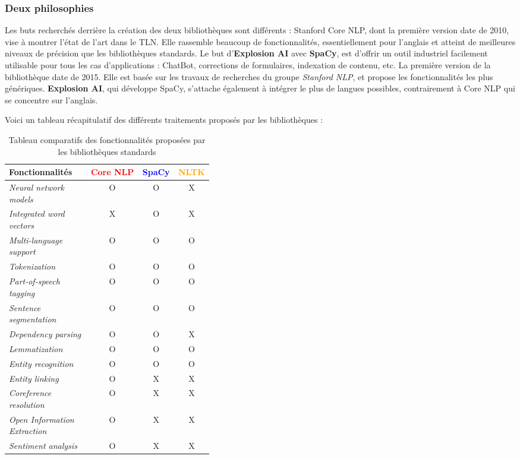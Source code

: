 \subsubsection{Deux philosophies}
Les buts recherchés derrière la création des deux bibliothèques sont différents : Stanford Core NLP, dont la première version date de 2010, vise à montrer l'état de l'art dans le TLN. Elle rassemble beaucoup de fonctionnalités, essentiellement pour l'anglais et atteint de meilleures niveaux de précision que les bibliothèques standards. Le but d'\textbf{Explosion AI} avec \textbf{SpaCy}, est d'offrir un outil industriel facilement utilisable pour tous les cas d'applications : ChatBot, corrections de formulaires, indexation de contenu, etc. La première version de la bibliothèque date de 2015. Elle est basée sur les travaux de recherches du groupe \textit{Stanford NLP}, et propose les fonctionnalités les plus génériques. \textbf{Explosion AI}, qui développe SpaCy, s'attache également à intégrer le plus de langues possibles, contrairement à Core NLP qui se concentre sur l'anglais.
\newline

Voici un tableau récapitulatif des différents traitements proposés par les bibliothèques :
\vspace{10pt}
\begin{table}[H]
    \centering
    \begin{tabular}{| p{0.4\linewidth} | c | c | c |}
        \hline 
        \textbf{Fonctionnalités} &\textcolor{red}{Core NLP} &\textcolor{blue}{SpaCy} &\textcolor{orange}{NLTK}\\
        \hline
        \hline 
        \textit{Neural network models} &O &O &X\\
        \hline 
        \textit{Integrated word vectors} &X &O &X\\
        \hline 
        \textit{Multi-language support} &O &O &O\\
        \hline 
        \textit{Tokenization} &O &O &O\\
        \hline
        \textit{Part-of-speech tagging} &O &O &O\\		
        \hline 
        \textit{Sentence segmentation} &O &O &O\\
        \hline 
        \textit{Dependency parsing} &O &O &X\\
        \hline
        \textit{Lemmatization} &O &O &O\\
        \hline 
        \textit{Entity recognition} &O &O &O\\
        \hline 
        \textit{Entity linking} &O &X &X\\
        \hline 
        \textit{Coreference resolution} &O &X &X\\
        \hline 
        \textit{Open Information Extraction} &O &X &X\\
        \hline 
        \textit{Sentiment analysis} &O &X &X\\
        \hline
    \end{tabular}
    \caption{Tableau comparatifs des fonctionnalités proposées par les bibliothèques standards}
    \label{tab:nlp-compare}
\end{table}
\vspace{5pt}

